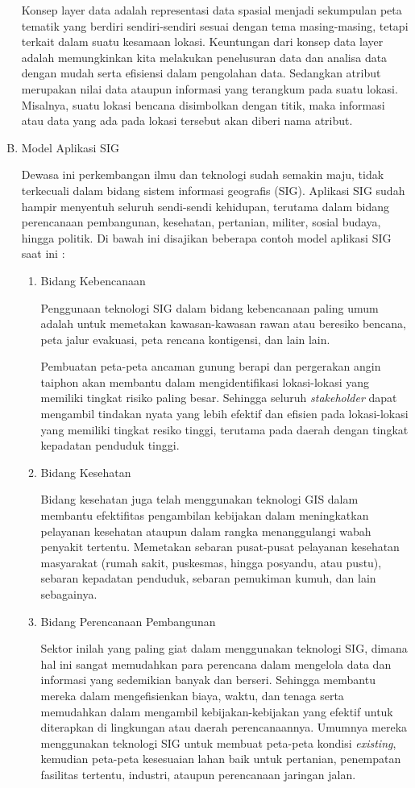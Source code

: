 \begin{enumerate}[A.]
Konsep layer data adalah representasi data spasial menjadi sekumpulan peta tematik yang berdiri sendiri-sendiri sesuai dengan tema masing-masing, tetapi terkait dalam suatu kesamaan lokasi. Keuntungan dari konsep data layer adalah memungkinkan kita melakukan penelusuran data dan analisa data dengan mudah serta efisiensi dalam pengolahan data. Sedangkan atribut merupakan nilai data ataupun informasi yang terangkum pada suatu lokasi. Misalnya, suatu lokasi bencana disimbolkan dengan titik, maka informasi atau data yang ada pada lokasi tersebut akan diberi nama atribut.

\item Model Aplikasi SIG

Dewasa ini perkembangan ilmu dan teknologi sudah semakin maju, tidak terkecuali dalam bidang sistem informasi geografis (SIG). Aplikasi SIG sudah hampir menyentuh seluruh sendi-sendi kehidupan, terutama dalam bidang perencanaan pembangunan, kesehatan, pertanian, militer, sosial budaya, hingga politik. Di bawah ini disajikan beberapa contoh model aplikasi SIG saat ini :

\begin{enumerate}[1.]
\item Bidang Kebencanaan

Penggunaan teknologi SIG dalam bidang kebencanaan paling umum adalah untuk memetakan kawasan-kawasan rawan atau beresiko bencana, peta jalur evakuasi, peta rencana kontigensi, dan lain lain. 

Pembuatan peta-peta ancaman gunung berapi dan pergerakan angin taiphon akan membantu dalam mengidentifikasi lokasi-lokasi yang memiliki tingkat risiko paling besar. Sehingga seluruh \textit{stakeholder} dapat mengambil tindakan nyata yang lebih efektif dan efisien pada lokasi-lokasi yang memiliki tingkat resiko tinggi, terutama pada daerah dengan tingkat kepadatan penduduk tinggi.

\item Bidang Kesehatan

Bidang kesehatan juga telah menggunakan teknologi GIS dalam membantu efektifitas pengambilan kebijakan dalam meningkatkan pelayanan kesehatan ataupun dalam rangka menanggulangi wabah penyakit tertentu. Memetakan sebaran pusat-pusat pelayanan kesehatan masyarakat (rumah sakit, puskesmas, hingga posyandu, atau pustu), sebaran kepadatan penduduk, sebaran pemukiman kumuh, dan lain sebagainya.

\item Bidang Perencanaan Pembangunan

Sektor inilah yang paling giat dalam menggunakan teknologi SIG, dimana hal ini sangat memudahkan para perencana dalam mengelola data dan informasi yang sedemikian banyak dan berseri. Sehingga membantu mereka dalam mengefisienkan biaya, waktu, dan tenaga serta memudahkan dalam mengambil kebijakan-kebijakan yang efektif untuk diterapkan di lingkungan atau daerah perencanaannya. Umumnya mereka menggunakan teknologi SIG untuk membuat peta-peta kondisi \textit{existing}, kemudian peta-peta kesesuaian lahan baik untuk pertanian, penempatan fasilitas tertentu, industri, ataupun perencanaan jaringan jalan.
\end{enumerate}

\end{enumerate}
